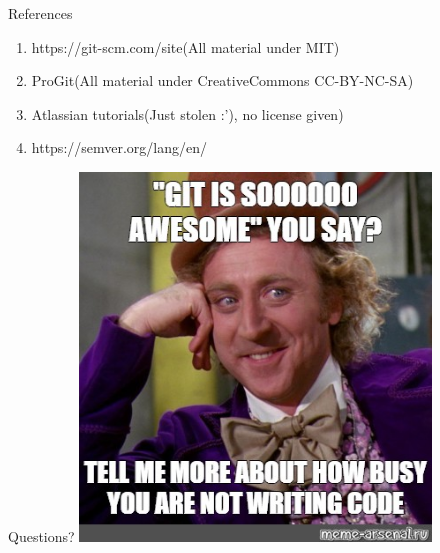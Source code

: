 \documentclass{beamer}
\begin{document}
\begin{frame}[fragile,t]{References}\vspace{10pt}
  \begin{enumerate}
    \item https://git-scm.com/site(All material under MIT)
    \item ProGit(All material under CreativeCommons CC-BY-NC-SA)
    \item Atlassian tutorials(Just stolen :'), no license given)
    \item https://semver.org/lang/en/
  \end{enumerate}
\end{frame}

\begin{frame}{Questions?}
  \centering
      \includegraphics[width=0.7\textwidth,height=0.7\textheight]{memes/git_awesome.jpg}
\end{frame}
\end{document}

